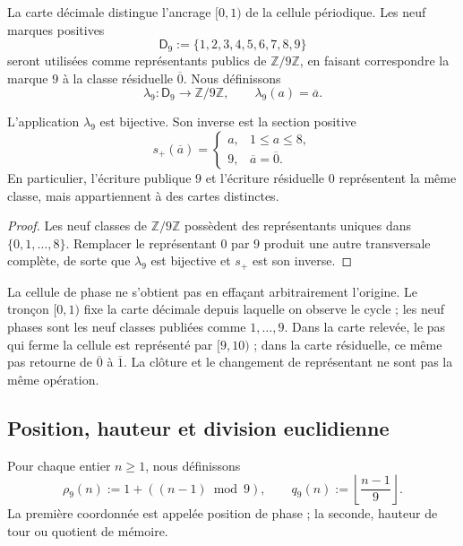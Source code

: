 La carte décimale distingue l’ancrage \([0,1)\) de la cellule périodique. Les
neuf marques positives
\[
 \mathsf D_9:=\{1,2,3,4,5,6,7,8,9\}
\]
seront utilisées comme représentants publics de
\(\mathbb Z/9\mathbb Z\), en faisant correspondre la marque \(9\) à la classe
résiduelle \(\overline 0\). Nous définissons
\[
 \lambda_9:\mathsf D_9\longrightarrow\mathbb Z/9\mathbb Z,
 \qquad \lambda_9(a)=\overline a.
\]

\begin{proposition}
\label{p12-83-c1-s4:prop:carta-positiva-nonadica}
L’application \(\lambda_9\) est bijective. Son inverse est la section positive
\[
 s_+(\overline a)=
 \begin{cases}
 a,&1\leq a\leq8,\\
 9,&\overline a=\overline0.
 \end{cases}
\]
En particulier, l’écriture publique \(9\) et l’écriture résiduelle \(0\)
représentent la même classe, mais appartiennent à des cartes distinctes.
\end{proposition}

\begin{proof}
Les neuf classes de \(\mathbb Z/9\mathbb Z\) possèdent des représentants uniques dans
\(\{0,1,\ldots,8\}\). Remplacer le représentant \(0\) par \(9\) produit
une autre transversale complète, de sorte que \(\lambda_9\) est bijective et \(s_+\)
est son inverse.
\end{proof}

La cellule de phase ne s’obtient pas en effaçant arbitrairement l’origine. Le tronçon
\([0,1)\) fixe la carte décimale depuis laquelle on observe le cycle ; les neuf
phases sont les neuf classes publiées comme \(1,\ldots,9\). Dans la carte
relevée, le pas qui ferme la cellule est représenté par \([9,10)\) ; dans la
carte résiduelle, ce même pas retourne de \(\overline0\) à \(\overline1\).
La clôture et le changement de représentant ne sont pas la même opération.

\subsection{Position, hauteur et division euclidienne}

\begin{definition}
Pour chaque entier \(n\geq1\), nous définissons
\[
 \rho_9(n):=1+((n-1)\bmod9),
 \qquad
 q_9(n):=\left\lfloor\frac{n-1}{9}\right\rfloor.
\]
La première coordonnée est appelée position de phase ; la seconde, hauteur de
tour ou quotient de mémoire.
\end{definition}

